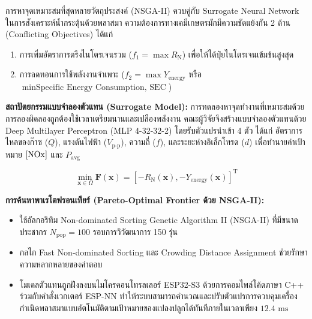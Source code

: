 \begin{aibox}{การหาจุดเหมาะสมที่สุดหลายวัตถุประสงค์ (NSGA-II) ควบคู่กับ Surrogate Neural Network}
ในการสังเคราะห์น้ำกระตุ้นด้วยพลาสมา ความต้องการทางเคมีเกษตรมักมีความขัดแย้งกัน 2 ด้าน (Conflicting Objectives) ได้แก่
\begin{enumerate}
    \item การเพิ่มอัตราการตรึงไนโตรเจนรวม ($f_1 = \max R_{\text{N}}$) เพื่อให้ได้ปุ๋ยไนโตรเจนเข้มข้นสูงสุด
    \item การลดทอนการใช้พลังงานจำเพาะ ($f_2 = \max Y_{\text{energy}}$ หรือ $\min \text{Specific Energy Consumption, SEC}$)
\end{enumerate}

\textbf{สถาปัตยกรรมแบบจำลองตัวแทน (Surrogate Model):}
การทดลองหาจุดทำงานที่เหมาะสมด้วยการลองผิดลองถูกต้องใช้เวลาเตรียมนานและเปลืองพลังงาน คณะผู้วิจัยจึงสร้างแบบจำลองตัวแทนด้วย Deep Multilayer Perceptron (MLP 4-32-32-2) โดยรับตัวแปรนำเข้า 4 ตัว ได้แก่ อัตราการไหลของก๊าซ ($Q$), แรงดันไฟฟ้า ($V_{\text{p-p}}$), ความถี่ ($f$), และระยะห่างอิเล็กโทรด ($d$) เพื่อทำนายค่าเป้าหมาย $[\ce{NOx}]$ และ $P_{\text{avg}}$

\begin{equation}
    \min_{\mathbf{x} \in \Omega} \mathbf{F}(\mathbf{x}) = \left[ -R_{\text{N}}(\mathbf{x}), -Y_{\text{energy}}(\mathbf{x}) \right]^{\text{T}}
\end{equation}

\textbf{การค้นหาพาเรโตฟรอนเทียร์ (Pareto-Optimal Frontier ด้วย NSGA-II):}
\begin{itemize}
    \item ใช้อัลกอริทึม Non-dominated Sorting Genetic Algorithm II (NSGA-II) ที่มีขนาดประชากร $N_{\text{pop}} = 100$ รอบการวิวัฒนาการ 150 รุ่น
    \item กลไก Fast Non-dominated Sorting และ Crowding Distance Assignment ช่วยรักษาความหลากหลายของคำตอบ
    \item โมเดลตัวแทนถูกฝังลงบนไมโครคอนโทรลเลอร์ ESP32-S3 ด้วยการคอมไพล์โค้ดภาษา C++ ร่วมกับคำสั่งเวกเตอร์ ESP-NN ทำให้ระบบสามารถคำนวณและปรับตัวแปรการควบคุมเครื่องกำเนิดพลาสมาแบบอัตโนมัติตามเป้าหมายของแปลงปลูกได้ทันทีภายในเวลาเพียง $12.4 \text{ ms}$
\end{itemize}
\end{aibox}

